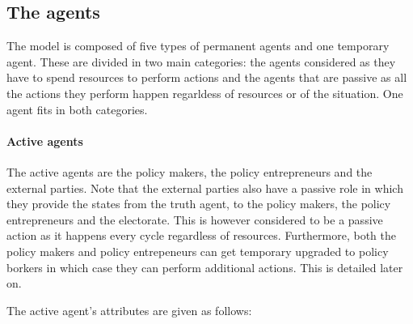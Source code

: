 \subsection{The agents}

The model is composed of five types of permanent agents and one temporary agent. These are divided in two main categories: the agents considered as they have to spend resources to perform actions and the agents that are passive as all the actions they perform happen regarldess of resources or of the situation. One agent fits in both categories.

\paragraph{Active agents}

The active agents are the policy makers, the policy entrepreneurs and the external parties. Note that the external parties also have a passive role in which they provide the states from the truth agent, to the policy makers, the policy entrepreneurs and the electorate. This is however considered to be a passive action as it happens every cycle regardless of resources. Furthermore, both the policy makers and policy entrepeneurs can get temporary upgraded to policy borkers in which case they can perform additional actions. This is detailed later on.

The active agent's attributes are given as follows:

